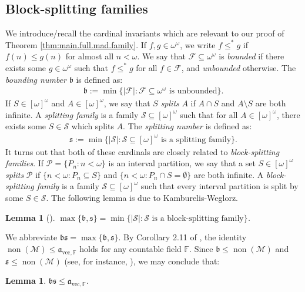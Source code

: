 \documentclass[11pt,reqno]{amsart}
\theoremstyle{plain}
\numberwithin{equation}{section}
\newtheorem{lemma}[theorem]{Lemma}
\theoremstyle{definition}
\newcommand{\func}{\operatorname}
\newcommand{\Po}{\cal{P}}
\newcommand{\F}{\cal{F}}
\newcommand{\cal}{\mathcal}
\renewcommand{\frak}{\mathfrak}
\newcommand{\non}{\func{non}}
\newcommand{\M}{\mathcal{M}}
\newcommand{\avec}{\frak{a}_{\mathrm{vec},\mathbb{F}}}
\renewcommand{\S}{\mathcal{S}}
\begin{document}
\subsection{Block-splitting families}
We introduce/recall the cardinal invariants which are relevant to our proof of Theorem \ref{thm:main.full.mad.family}. If $f,g \in \omega^\omega$, we write $f \leq^* g$ if $f(n) \leq g(n)$ for almost all $n < \omega$. We say that $\F \subseteq \omega^\omega$ is \emph{bounded} if there exists some $g \in \omega^\omega$ such that $f \leq^* g$ for all $f \in \F$, and \emph{unbounded} otherwise. The \emph{bounding number} $\frak{b}$ is defined as:
\begin{align*}
    \frak{b} := \min\{|\F| : \F \subseteq \omega^\omega \text{ is unbounded}\}.
\end{align*}
If $S \in [\omega]^\omega$ and $A \in [\omega]^\omega$, we say that $S$ \emph{splits} $A$ if $A \cap S$ and $A \setminus S$ are both infinite. A \emph{splitting family} is a family $\S \subseteq [\omega]^\omega$ such that for all $A \in [\omega]^\omega$, there exists some $S \in \S$ which splits $A$. The \emph{splitting number} is defined as:
\begin{align*}
    \frak{s} := \min\{|\S| : \S \subseteq [\omega]^\omega \text{ is a splitting family}\}.
\end{align*}
It turns out that both of these cardinals are closely related to \emph{block-splitting families}. If $\Po = \{P_n : n < \omega\}$ is an interval partition, we say that a set $S \in [\omega]^\omega$ \emph{splits} $\Po$ if $\{n < \omega : P_n \subseteq S\}$ and $\{n < \omega : P_n \cap S = \emptyset\}$ are both infinite. A \emph{block-splitting family} is a family $\S \subseteq [\omega]^\omega$ such that every interval partition is split by some $S \in \S$. The following lemma is due to Kamburelis-Weglorz.

\begin{lemma}[\cite{KW96}]
    $\max\{\frak{b},\frak{s}\} = \min\{|\S| : \S \text{ is a block-splitting family}\}$.
\end{lemma}

We abbreviate $\frak{bs} = \max\{\frak{b},\frak{s}\}$. By Corollary 2.11 of \cite{S19}, the identity $\non(\M) \leq \avec$ holds for any countable field $\mathbb{F}$. Since $\frak{b} \leq \non(\M)$ and $\frak{s} \leq \non(\M)$ (see, for instance, \cite{blasshandbook}), we may conclude that:

\begin{lemma}
\label{lem:bs.leq.avec}
    $\frak{bs} \leq \avec$.
\end{lemma}
\end{document}
